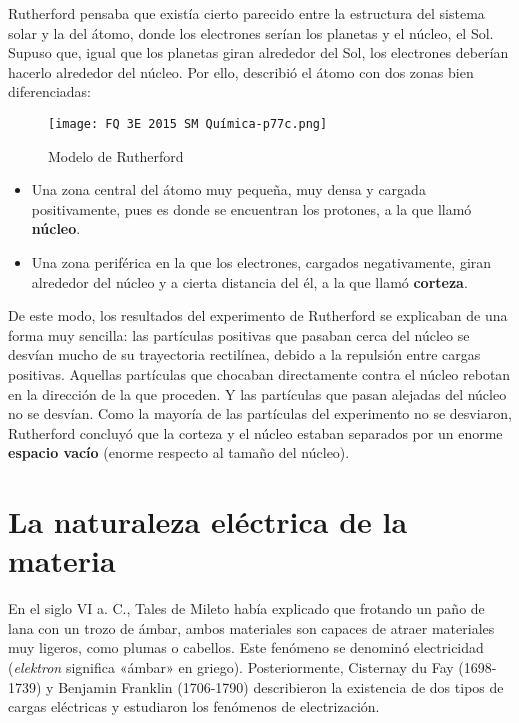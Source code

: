 \documentclass[
  spanish,
]{article}
\providecommand{\tightlist}{%
  \setlength{\itemsep}{0pt}\setlength{\parskip}{0pt}}
\begin{document}
Rutherford pensaba que existía cierto parecido entre la estructura del
sistema solar y la del átomo, donde los electrones serían los planetas y
el núcleo, el Sol. Supuso que, igual que los planetas giran alrededor
del Sol, los electrones deberían hacerlo alrededor del núcleo. Por ello,
describió el átomo con dos zonas bien diferenciadas:

\begin{figure}
\centering
\texttt{[image: FQ 3E 2015 SM Química-p77c.png]}
\caption{Modelo de Rutherford}
\end{figure}

\begin{itemize}
\tightlist
\item
  Una zona central del átomo muy pequeña, muy densa y cargada
  positivamente, pues es donde se encuentran los protones, a la que
  llamó \textbf{núcleo}.
\item
  Una zona periférica en la que los electrones, cargados negativamente,
  giran alrededor del núcleo y a cierta distancia del él, a la que llamó
  \textbf{corteza}.
\end{itemize}

De este modo, los resultados del experimento de Rutherford se explicaban
de una forma muy sencilla: las partículas positivas que pasaban cerca
del núcleo se desvían mucho de su trayectoria rectilínea, debido a la
repulsión entre cargas positivas. Aquellas partículas que chocaban
directamente contra el núcleo rebotan en la dirección de la que
proceden. Y las partículas que pasan alejadas del núcleo no se desvían.
Como la mayoría de las partículas del experimento no se desviaron,
Rutherford concluyó que la corteza y el núcleo estaban separados por un
enorme \textbf{espacio vacío} (enorme respecto al tamaño del núcleo).

\hypertarget{la-naturaleza-eluxe9ctrica-de-la-materia}{%
\section{La naturaleza eléctrica de la
materia}\label{la-naturaleza-eluxe9ctrica-de-la-materia}}

En el siglo VI a. C., Tales de Mileto había explicado que frotando un
paño de lana con un trozo de ámbar, ambos materiales son capaces de
atraer materiales muy ligeros, como plumas o cabellos. Este fenómeno se
denominó electricidad (\emph{elektron} significa «ámbar» en griego).
Posteriormente, Cisternay du Fay (1698-1739) y Benjamin Franklin
(1706-1790) describieron la existencia de dos tipos de cargas eléctricas
y estudiaron los fenómenos de electrización.
\end{document}

